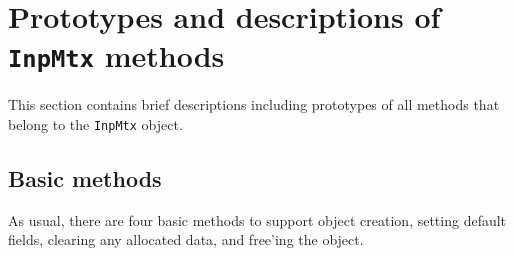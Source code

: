 \par
\section{Prototypes and descriptions of {\tt InpMtx} methods}
\label{section:InpMtx:proto}
\par
This section contains brief descriptions including prototypes
of all methods that belong to the {\tt InpMtx} object.
\par
\subsection{Basic methods}
\label{subsection:InpMtx:proto:basics}
\par
As usual, there are four basic methods to support object creation,
setting default fields, clearing any allocated data, and free'ing
the object.
\par
